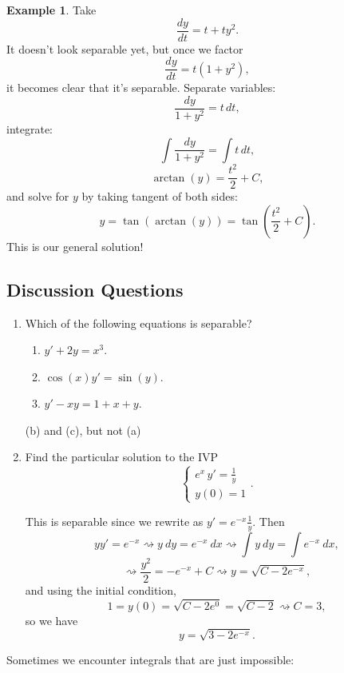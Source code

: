\documentclass[12pt]{amsart}
\numberwithin{equation}{section}
\theoremstyle{plain} %
\newcommand{\rsa}{\rightsquigarrow}
\theoremstyle{definition}
\newtheorem{ex}[equation]{Example}
\theoremstyle{remark}
\begin{document}
\begin{ex} Take
\[ \frac{dy}{dt} = t + ty^2.\]
It doesn't look separable yet, but once we factor
\[ \frac{dy}{dt} = t (1 +y^2),\]
it becomes clear that it's separable. Separate variables:
\[ \frac{dy}{1+y^2} = t \, dt,\]
integrate:
\[ \int \frac{dy}{1+y^2} = \int t \, dt,\]
\[ \arctan(y) = \frac{t^2}{2} + C,\]
and solve for $y$ by taking tangent of both sides:
\[ y=\tan(\arctan(y)) = \tan\left(  \frac{t^2}{2} + C\right).\]
This is our general solution!
\end{ex}


\subsection*{Discussion Questions}
\begin{enumerate}
\item Which of the following equations is separable?
\begin{enumerate}
\item $y' + 2y = x^3$.
\item $\cos(x) y' = \sin(y)$.
\item $y' - xy = 1+x+y$.
\end{enumerate}
\begin{framed}
(b) and (c), but not (a)
\end{framed}
\item Find the particular solution to the IVP
\[ \begin{cases} 
e^{x} \, y' = \frac{1}{y} \\
y(0) = 1\end{cases}.\]
\begin{framed}
This is separable since we rewrite as $y' = e^{-x} \frac{1}{y}$. Then
\[ y y' = e^{-x} \rsa y  \ dy = e^{-x} \ dx \rsa \int  y  \ dy = \int e^{-x} \ dx,\]
\[ \rsa \frac{y^2}{2} = -e^{-x} + C \rsa y = \sqrt{C - 2 e^{-x}},\]
and using the initial condition,
\[ 1 = y(0) = \sqrt{C - 2 e^{0}} = \sqrt{C-2} \rsa C=3,\]
so we have
\[ y = \sqrt{3 - 2 e^{-x}}.\]
\end{framed}
\end{enumerate}

Sometimes we encounter integrals that are just impossible:

\end{document}
